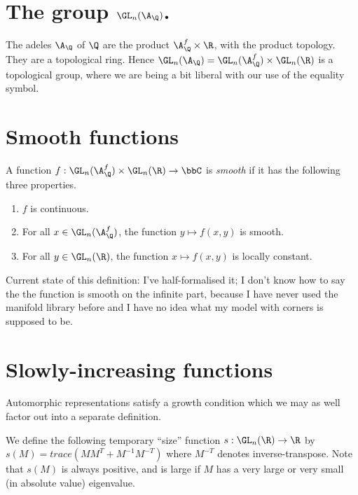 \section[The adelic general linear group]{The group $\GL_n(\A_{\Q})$.}

The adeles $\A_{\Q}$ of $\Q$ are the product $\A_{\Q}^f\times\R$, with the product topology.
They are a topological ring. Hence $\GL_n(\A_{\Q})=\GL_n(\A_{\Q}^f)\times\GL_n(\R)$ is a
topological group, where we are being a bit liberal with our use of the equality symbol.

\section{Smooth functions}

\begin{definition}
  \label{AutomorphicForm.GLn.IsSmooth}
  A function $f:\GL_n(\A_{\Q}^f)\times\GL_n(\R)\to\bbC$ is \emph{smooth}
  if it has the following three properties.

  \begin{enumerate}
    \item $f$ is continuous.
    \item For all $x\in\GL_n(\A_{\Q}^f)$, the function $y\mapsto f(x,y)$ is smooth.
    \item For all $y\in\GL_n(\R)$, the function $x\mapsto f(x,y)$ is locally constant.
  \end{enumerate}
\end{definition}

Current state of this definition: I've half-formalised it; I don't know how to say the the
function is smooth on the infinite part, because I have never used the manifold library before
and I have no idea what my model with corners is supposed to be.

\section{Slowly-increasing functions}

Automorphic representations satisfy a growth condition which we may as well factor out
into a separate definition.

We define the following temporary ``size'' function $s:\GL_n(\R)\to\R$ by
$s(M)=trace(MM^T+M^{-1}M^{-T})$ where $M^{-T}$ denotes inverse-transpose. Note that
$s(M)$ is always positive, and is large if $M$ has a very large or very small
(in absolute value) eigenvalue.

